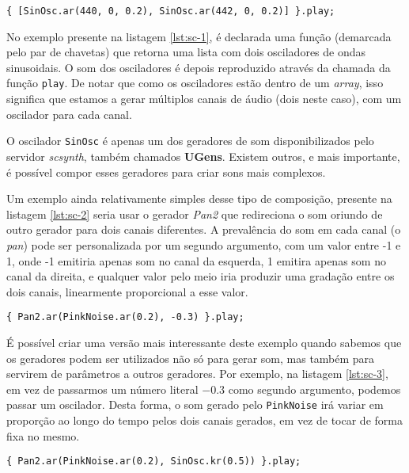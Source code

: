 \begin{lstlisting}[caption={Declaração de dois canais de aúdio com base em dois osciladores},label={lst:sc-1}]
{ [SinOsc.ar(440, 0, 0.2), SinOsc.ar(442, 0, 0.2)] }.play;
\end{lstlisting}

No exemplo presente na listagem \ref{lst:sc-1}, é declarada uma função (demarcada pelo par de chavetas) que retorna uma lista com dois osciladores de ondas sinusoidais. O som dos osciladores é depois reproduzido através da chamada da função \texttt{play}. De notar que como os osciladores estão dentro de um \textit{array}, isso significa que estamos a gerar múltiplos canais de áudio (dois neste caso), com um oscilador para cada canal.

O oscilador \texttt{SinOsc} é apenas um dos geradores de som disponibilizados pelo servidor \textit{scsynth}, também chamados \textbf{UGens}. Existem outros, e mais importante, é possível compor esses geradores para criar sons mais complexos.

Um exemplo ainda relativamente simples desse tipo de composição, presente na listagem \ref{lst:sc-2} seria usar o gerador \textit{Pan2} que redireciona o som oriundo de outro gerador para dois canais diferentes. A prevalência do som em cada canal (o \textit{pan}) pode ser personalizada por um segundo argumento, com um valor entre -1 e 1, onde -1 emitiria apenas som no canal da esquerda, 1 emitira apenas som no canal da direita, e qualquer valor pelo meio iria produzir uma gradação entre os dois canais, linearmente proporcional a esse valor.

\begin{lstlisting}[caption={Dividir um gerador por dois canais de forma desigual},label={lst:sc-2}]
{ Pan2.ar(PinkNoise.ar(0.2), -0.3) }.play;
\end{lstlisting}

É possível criar uma versão mais interessante deste exemplo quando sabemos que os geradores podem ser utilizados não só para gerar som, mas também para servirem de parâmetros a outros geradores. Por exemplo, na listagem \ref{lst:sc-3}, em vez de passarmos um número literal $-0.3$ como segundo argumento, podemos passar um oscilador. Desta forma, o som gerado pelo \texttt{PinkNoise} irá variar em proporção ao longo do tempo pelos dois canais gerados, em vez de tocar de forma fixa no mesmo.

\begin{lstlisting}[caption={Dividir um gerador por dois canais de forma desigual},label={lst:sc-3}]
{ Pan2.ar(PinkNoise.ar(0.2), SinOsc.kr(0.5)) }.play;
\end{lstlisting}

